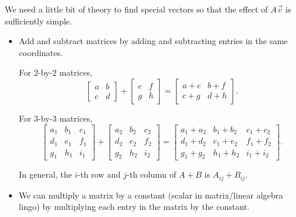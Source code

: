 \documentclass[../main.tex]{subfiles}
\begin{document}
We need a little bit of theory to find special vectors so that the effect of \(A\vec{v}\) is sufficiently simple. 

\begin{itemize}
  \item Add and subtract matrices by adding and subtracting entries in the same coordinates.

    For \(2\)-by-\(2\) matrices, 
    \[
      \begin{bmatrix}
        a & b \\ 
        c & d
      \end{bmatrix}
      +
      \begin{bmatrix}
        e & f \\ 
        g & h
      \end{bmatrix}
      =
      \begin{bmatrix}
        a + e & b + f \\ 
        c + g & d + h
      \end{bmatrix}.
    \]

    For \(3\)-by-\(3\) matrices,
    \[
      \begin{bmatrix}
        a_{1} & b_{1} & c_{1} \\
        d_{1} & e_{1} & f_{1} \\
        g_{1} & h_{1} & i_{1}
      \end{bmatrix}
      +
      \begin{bmatrix}
        a_{2} & b_{2} & c_{2} \\
        d_{2} & e_{2} & f_{2} \\
        g_{2} & h_{2} & i_{2}
      \end{bmatrix}
      =
      \begin{bmatrix}
        a_{1} + a_{2} & b_{1} + b_{2} & c_{1} + c_{2} \\
        d_{1} + d_{2} & e_{1} + e_{2} & f_{1} + f_{2} \\
        g_{1} + g_{2} & h_{1} + h_{2} & i_{1} + i_{2}
      \end{bmatrix}.
    \]
     

    In general, the \(i\)-th row and \(j\)-th column of \(A + B\) is \(A_{ij} + B_{ij}\).

  \item We can multiply a matrix by a constant (scalar in matrix/linear algebra lingo) by multiplying each entry in the matrix by the constant.


\end{itemize}
\end{document}
